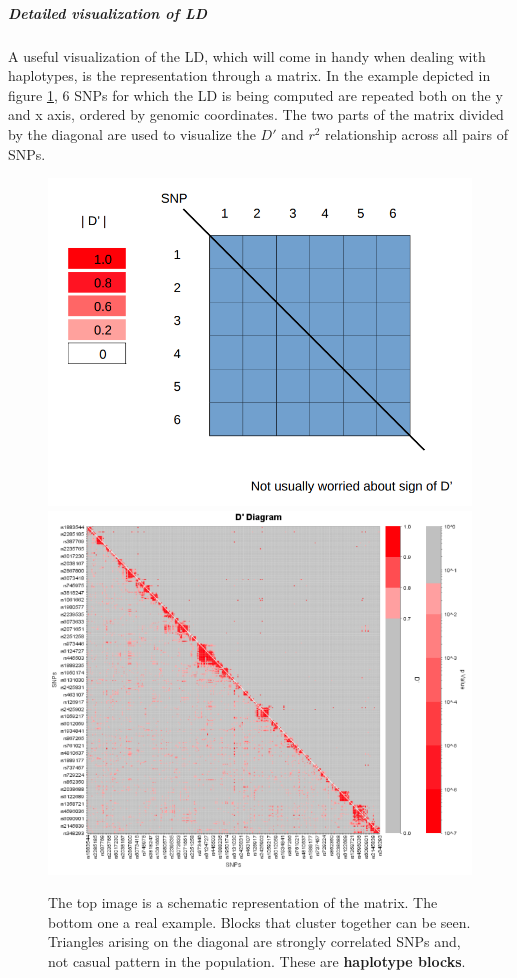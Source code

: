 			\subparagraph{Detailed visualization of LD}
			A useful visualization of the LD, which will come in handy when dealing with haplotypes, is the representation through a matrix.
			In the example depicted in figure \ref{fig:visual}, 6 SNPs for which the LD is being computed are repeated both on the y and x axis, ordered by genomic coordinates.
			The two parts of the matrix divided by the diagonal are used to visualize the $D'$ and $r^2$ relationship across all pairs of SNPs.

			\begin{figure}[H]
				\centering
				\includegraphics[scale=0.2]{vis1}
				\includegraphics[scale=0.3]{vis2}
				\caption{The top image is a schematic representation of the matrix. The bottom one a real example. Blocks that cluster together can be seen. Triangles arising on the diagonal are strongly correlated SNPs and, not casual pattern in the population. These are \textbf{haplotype blocks}.}
				\label{fig:visual}
				\end{figure}


